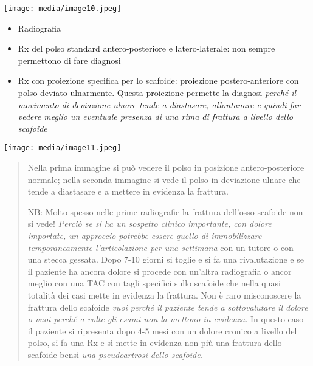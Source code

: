 \documentclass[]{article}
\begin{document}
\texttt{[image: media/image10.jpeg]}

\begin{itemize}
\item
  Radiografia
\end{itemize}

\begin{itemize}
\item
  Rx del polso standard antero-posteriore e latero-laterale: non sempre
  permettono di fare diagnosi
\item
  Rx con proiezione specifica per lo scafoide: proiezione
  postero-anteriore con polso deviato ulnarmente. Questa proiezione
  permette la diagnosi \emph{perché il movimento di deviazione ulnare
  tende a diastasare, allontanare e quindi far vedere meglio un
  eventuale presenza di una rima di frattura a livello dello scafoide}
\end{itemize}

\texttt{[image: media/image11.jpeg]}

\begin{quote}
Nella prima immagine si può vedere il polso in posizione
antero-posteriore normale; nella seconda immagine si vede il polso in
deviazione ulnare che tende a diastasare e a mettere in evidenza la
frattura.

NB: Molto spesso nelle prime radiografie la frattura dell'osso scafoide
non si vede! \emph{Perciò se si ha un sospetto clinico importante, con
dolore importate, un approccio potrebbe essere quello di
\emph{immobilizzare temporaneamente l'articolazione per una settimana}}
con un tutore o con una stecca gessata. Dopo 7-10 giorni si toglie e si
fa una rivalutazione e se il paziente ha ancora dolore si procede con
un'altra radiografia o ancor meglio con una TAC con tagli specifici
sullo scafoide che nella quasi totalità dei casi mette in evidenza la
frattura. Non è raro misconoscere la frattura dello scafoide \emph{vuoi
perché il paziente tende a sottovalutare il dolore o vuoi perché a volte
gli esami non la mettono in evidenza.} In questo caso il paziente si
ripresenta dopo 4-5 mesi con un dolore cronico a livello del polso, si
fa una Rx e si mette in evidenza non più una frattura dello scafoide
bensì \emph{una pseudoartrosi dello scafoide.}
\end{quote}
\end{document}
